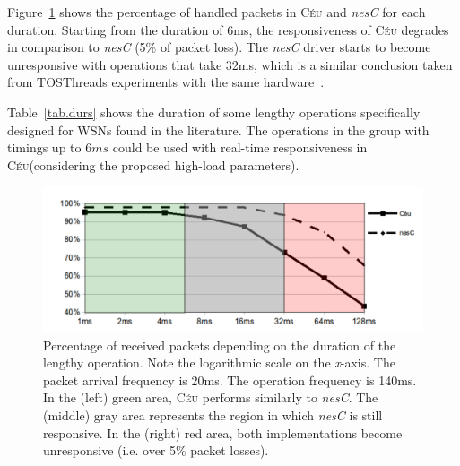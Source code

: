 \documentclass[letterpaper]{sig-alternate}
\newcommand{\CEU}{\textsc{C\'{e}u}\xspace}
\begin{document}
Figure~\ref{fig.radio1} shows the percentage of handled packets in \CEU and 
\emph{nesC} for each duration.
%
Starting from the duration of 6ms, the responsiveness of \CEU degrades in 
comparison to \emph{nesC} (5\% of packet loss).
%
The \emph{nesC} driver starts to become unresponsive with operations that take 
32ms, which is a similar conclusion taken from TOSThreads experiments with the 
same hardware~\cite{wsn.tosthreads}.
%

%
Table~\ref{tab.durs} shows the duration of some lengthy operations specifically 
designed for WSNs found in the literature.
The operations in the group with timings up to $6ms$ could be used with 
real-time responsiveness in \CEU (considering the proposed high-load 
parameters).

\begin{figure}[t]
\includegraphics[width=\linewidth,clip=true,trim=35px 0px 10px 0px]{radio1}
\caption{ Percentage of received packets depending on the duration of the 
lengthy operation.  \newline
{\small %
Note the logarithmic scale on the \emph{x}-axis.
The packet arrival frequency is 20ms.
The operation frequency is 140ms.
In the (left) green area, \CEU performs similarly to \emph{nesC}.
The (middle) gray area represents the region in which \emph{nesC} is still 
responsive.
In the (right) red area, both implementations become unresponsive (i.e. over 
5\% packet losses).
}%
\label{fig.radio1}
}
\end{figure}
\end{document}
